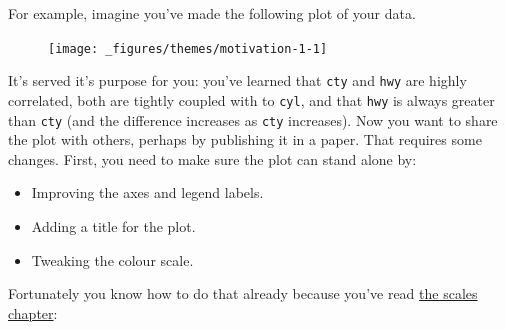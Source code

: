 For example, imagine you've made the following plot of your data.

\begin{Shaded}
\begin{Highlighting}[]
\StringTok{ } 
\StringTok{  }\NormalTok{() +}\StringTok{ }
\StringTok{  }\NormalTok{(} \NormalTok{, } \NormalTok{)}
\end{Highlighting}
\end{Shaded}

\begin{figure}[H]
  \centering
  \texttt{[image: \_figures/themes/motivation-1-1]}
\end{figure}

It's served it's purpose for you: you've learned that \texttt{cty} and
\texttt{hwy} are highly correlated, both are tightly coupled with to
\texttt{cyl}, and that \texttt{hwy} is always greater than \texttt{cty}
(and the difference increases as \texttt{cty} increases). Now you want
to share the plot with others, perhaps by publishing it in a paper. That
requires some changes. First, you need to make sure the plot can stand
alone by:

\begin{itemize}
\tightlist
\item
  Improving the axes and legend labels.
\item
  Adding a title for the plot.
\item
  Tweaking the colour scale.
\end{itemize}

Fortunately you know how to do that already because you've read
\hyperref[cha:scales]{the scales chapter}:

\begin{Shaded}
\begin{Highlighting}[]
\StringTok{ }
\StringTok{  }\NormalTok{(}
     \NormalTok{,}
     \NormalTok{,}
     \NormalTok{,}
     
  \NormalTok{) +}
\StringTok{  }\NormalTok{(} \NormalTok{, } \NormalTok{)}
\end{Highlighting}
\end{Shaded}

